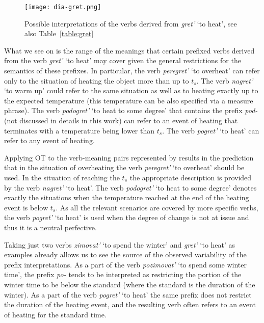 \begin{figure}
\centering
\texttt{[image: dia-gret.png]}
\caption{Possible interpretations of the verbs derived from \textit{gret'} `to heat', see also Table~\ref{table:gret} \label{fig:gret}}
\end{figure}

What we see on  is the range of the meanings that certain prefixed verbs derived from the verb \textit{gret'} `to heat' may cover given the general restrictions for the semantics of these prefixes. In particular, the verb \textit{peregret'} `to overheat' can refer only to the situation of heating the object more than up to $t_s$. The verb \textit{nagret'} `to warm up' could refer to the same situation as well as to heating exactly up to the expected temperature (this temperature can be also specified via a measure phrase). The verb \textit{podogret'} `to heat to some degree' that contains the prefix \textit{pod-} (not discussed in details in this work) can refer to an event of heating that terminates with a temperature being lower than $t_s$. The verb \textit{pogret'} `to heat' can refer to any event of heating.

Applying OT to the verb-meaning pairs represented by  results in the prediction that in the situation of overheating the verb \textit{peregret'} `to overheat' should be used. In the situation of reaching the $t_s$ the appropriate description is provided by the verb \textit{nagret'} `to heat'. The verb \textit{podogret'} `to heat to some degree' denotes exactly the situations when the temperature reached at the end of the heating event is below $t_s$. As all the relevant scenarios are covered by more specific verbs, the verb \textit{pogret'} `to heat' is used when the degree of change is not at issue and thus it is a neutral perfective.

Taking just two verbs \textit{zimovat'} `to spend the winter' and \textit{gret'} `to heat' as examples already allows us to see the source of the observed variability of the prefix interpretations. As a part of the verb \textit{pozimovat'} `to spend some winter time', the prefix \textit{po-} tends to be interpreted as restricting the portion of the winter time to be below the standard (where the standard is the duration of the winter). As a part of the verb \textit{pogret'} `to heat' the same prefix does not restrict the duration of the heating event, and the resulting verb often refers to an event of heating for the standard time. 

